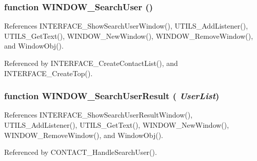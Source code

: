 \subsubsection{\setlength{\rightskip}{0pt plus 5cm}function WINDOW\_\-SearchUser ()}\label{window_2window_8js_c12a5400ad4c700cfc149d03ae412c47}




References INTERFACE\_\-ShowSearchUserWindow(), UTILS\_\-AddListener(), UTILS\_\-GetText(), WINDOW\_\-NewWindow(), WINDOW\_\-RemoveWindow(), and WindowObj().

Referenced by INTERFACE\_\-CreateContactList(), and INTERFACE\_\-CreateTop().
\subsubsection{\setlength{\rightskip}{0pt plus 5cm}function WINDOW\_\-SearchUserResult ( {\em UserList})}\label{window_2window_8js_6d03922beae5db1603fa1f2d195e4610}




References INTERFACE\_\-ShowSearchUserResultWindow(), UTILS\_\-AddListener(), UTILS\_\-GetText(), WINDOW\_\-NewWindow(), WINDOW\_\-RemoveWindow(), and WindowObj().

Referenced by CONTACT\_\-HandleSearchUser().
